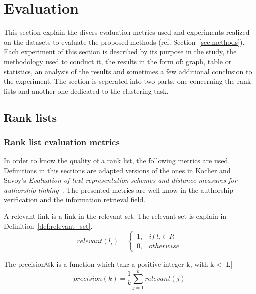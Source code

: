 \section{Evaluation \label{sec:evaluation}}

This section explain the divers evaluation metrics used and experiments realized on the datasets to evaluate the proposed methods (ref. Section~\ref{sec:methods}).
Each experiment of this section is described by its purpose in the study, the methodology used to conduct it, the results in the form of: graph, table or statistics, an analysis of the results and sometimes a few additional conclusion to the experiment.
The section is seperated into two parts, one concerning the rank lists and another one dedicated to the clustering task.

\subsection{Rank lists}

\subsubsection{Rank list evaluation metrics}
\label{sec:rl_eval}

In order to know the quality of a rank list, the following metrics are used.
Definitions in this sections are adapted versions of the ones in Kocher and Savoy's \textit{Evaluation of text representation schemes and distance measures for authorship linking}~\cite{kocher_linking}.
The presented metrics are well know in the authorship verification and the information retrieval field.

\begin{definition}
  A relevant link is a link in the relevant set.
  The relevant set is explain in Definition~\ref{def:relevant_set}.
  \begin{equation}
    relevant(l_i) =
    \begin{cases}
      1, & if\ l_i \in R \\
      0, & otherwise
    \end{cases}
  \end{equation}
\end{definition}

\begin{definition}
  The precision@k is a function which take a positive integer k, with k < |L|
  \begin{equation}
    precision(k) = \frac{1}{k} \sum_{j=1}^{k} relevant(j)
  \end{equation}
\end{definition}

